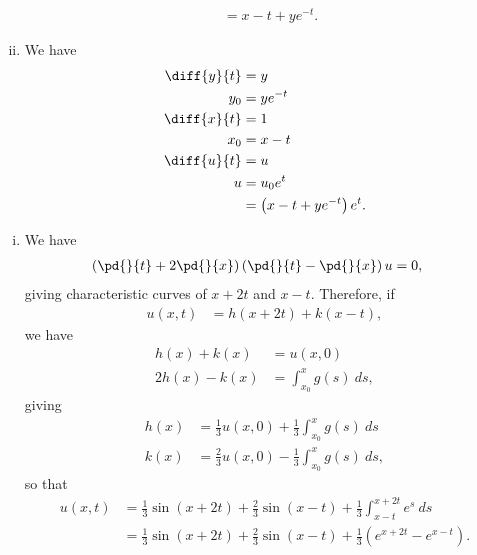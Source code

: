 \documentclass[10pt]{mypackage}
\begin{document}
\begin{solution}
\begin{enumerate}[(i)]
\begin{align*}
                              &= x-t + ye^{-t}.
      \end{align*}
    \item We have
      \begin{align*}
        \diff{y}{t} &= y\\
        y_0 &= ye^{-t}\\
        \diff{x}{t} &= 1\\
        x_0 &= x-t\\
        \diff{u}{t} &= u\\
        u &= u_0e^{t}\\
          &= \left( x-t + ye^{-t} \right)e^{t}.
      \end{align*}
  \end{enumerate}
\end{solution}
\begin{solution}\hfill
  \begin{enumerate}[(i)]
    \item We have
      \begin{align*}
        \left( \pd{}{t} + 2\pd{}{x} \right)\left( \pd{}{t} - \pd{}{x} \right) u &= 0,
      \end{align*}
      giving characteristic curves of $x+2t$ and $x-t$. Therefore, if
      \begin{align*}
        u\left( x,t \right) &= h\left( x+2t \right) + k\left( x-t \right),
      \end{align*}
      we have
      \begin{align*}
        h(x) + k(x) &= u\left( x,0 \right)\\
        2h(x) - k(x) &= \int_{x_0}^{x} g(s)\:ds,
      \end{align*}
      giving
      \begin{align*}
        h(x) &= \frac{1}{3}u\left( x,0 \right) + \frac{1}{3} \int_{x_0}^{x} g(s)\:ds\\
        k(x) &= \frac{2}{3} u\left( x,0 \right) - \frac{1}{3} \int_{x_0}^{x} g(s)\:ds,
      \end{align*}
      so that
      \begin{align*}
        u\left( x,t \right) &= \frac{1}{3}\sin\left( x+2t \right) + \frac{2}{3}\sin\left( x-t \right) + \frac{1}{3} \int_{x-t}^{x+2t} e^{s}\:ds\\
                            &= \frac{1}{3}\sin\left( x+2t \right) + \frac{2}{3}\sin\left( x-t \right) + \frac{1}{3}\left( e^{x+2t} - e^{x-t} \right).
      \end{align*}

\end{enumerate}
\end{solution}
\end{document}
